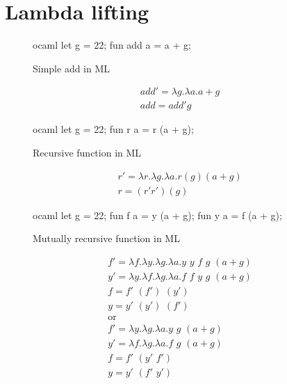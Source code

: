 \documentclass[11pt]{article}
\begin{document}
\section{Lambda lifting}
    \begin{figure}[htp]
        \centering
        \begin{cminted}{ocaml}
let g = 22;
fun add a = a + g;
        \end{cminted}
        \caption{Simple add in ML}
        \label{lst:simple_add}
    \end{figure}
    \begin{gather}
        add' = \lambda g. \lambda a. a + g \nonumber \\
        add = add' g
    \end{gather}
    \begin{figure}[htp]
        \centering
        \begin{cminted}{ocaml}
let g = 22;
fun r a = r (a + g);
        \end{cminted}
        \caption{Recursive function in ML}
        \label{lst:recursive_function}
    \end{figure}
    \begin{gather}
        r' = \lambda r. \lambda g. \lambda a. r (g) (a + g) \nonumber \\
        r = (r' r')(g)
    \end{gather}
    \begin{figure}[htp]
        \centering
        \begin{cminted}{ocaml}
let g = 22;
fun f a = y (a + g);
fun y a = f (a + g);
        \end{cminted}
        \caption{Mutually recursive function in ML}
        \label{lst:mutually_recursive}
    \end{figure}
    \begin{gather}
        f' = \lambda f. \lambda y. \lambda g. \lambda a. y \,\, y \,\, f \,\, g \,\, (a + g) \nonumber \\
        y' = \lambda y. \lambda f. \lambda g. \lambda a. f \,\, f \,\, y \,\, g \,\, (a + g) \nonumber \\
        f = f' \,\, (f') \,\, (y') \nonumber \\
        y = y' \,\, (y') \,\, (f') \nonumber \\
        \text{or} \nonumber \\
        f' = \lambda y. \lambda g. \lambda a. y \,\, g \,\, (a + g) \nonumber \\
        y' = \lambda f. \lambda g. \lambda a. f \,\, g \,\, (a + g) \nonumber \\
        f = f' \,\, (y' \,\, f') \nonumber \\
        y = y' \,\, (f' \,\, y')
    \end{gather}
\end{document}
